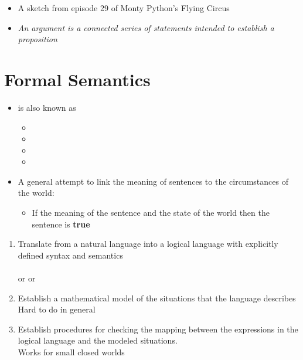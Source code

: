 \documentclass[headrule,footrule]{foils}
\begin{document}

\begin{itemize}
\item A sketch from episode 29 of
  Monty Python's Flying Circus
\item \textit{An argument is a connected series of statements intended to establish a proposition}
\end{itemize}



\section{Formal Semantics}



\begin{itemize}
\item {} is also known as
  \begin{itemize}
  \item {}
  \item {}
  \item {}
  \item {}
  \end{itemize}
\item A general attempt to link the meaning of sentences to the
  circumstances of the world: 
  \begin{itemize}
  \item If the meaning of the sentence and the state of the world
     then the sentence is \textbf{true}
  \end{itemize}
\end{itemize}


\begin{enumerate}
\item Translate from a natural language into a logical language
  with explicitly defined syntax and semantics
  \\[1ex]  \into 
  \\  or  or 
\item Establish a mathematical model of the situations that the
  language describes
  \\[1ex] Hard to do in general
\item Establish procedures for checking the mapping between the
  expressions in the logical language and the modeled situations.
  \\[1ex] Works for small closed worlds
\end{enumerate}
\end{document}
